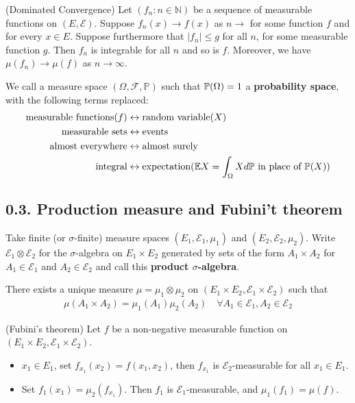 \documentclass[12pt,a4paper]{report}
\begin{document}
(Dominated Convergence) Let $(f_n :n \in \mathbb{N})$ be a sequence of measurable functions on $(E,\mathscr{E})$. Suppose $f_n(x) \rightarrow f(x)$ as $n\rightarrow$ for some function $f$ and for every $x\in E$. Suppose furthermore that $|f_n| \leq g$ for all $n$, for some measurable function $g$. Then $f_n$ is integrable for all $n$ and so is $f$. Moreover, we have $\mu(f_n) \rightarrow \mu(f)$ as $n\rightarrow \infty$.
\s

We call a measure space $(\Omega, \mathscr{F}, \mathbb{P})$ such that $\mathbb{P}(\Omega) =1$ a \textbf{probability space}, with the following terms replaced:
\begin{align*}
\text{measurable functions} (f) &\leftrightarrow \text{random variable} (X) \\
\text{measurable sets} &\leftrightarrow \text{events} \\
\text{almost everywhere} &\leftrightarrow \text{almost surely}\\
\text{integral} & \leftrightarrow \text{expectation}(\mathbb{E}{X} = \int_{\Omega} X d\mathbb{P} \text{ in place of } \mathbb{P}(X))
\end{align*}

\subsection*{0.3. Production measure and Fubini't theorem}

Take finite (or $\sigma$-finite) measure spaces $(E_1, \mathscr{E}_1, \mu_1)$ and $(E_2, \mathscr{E}_2, \mu_2)$. Write $\mathscr{E}_1 \otimes \mathscr{E}_2$ for the $\sigma$-algebra on $E_1 \times E_2$ generated by sets of the form $A_1 \times A_2$ for $A_1 \in \mathscr{E}_1$ and $A_2 \in \mathscr{E}_2$ and call this \textbf{product $\sigma$-algebra}.
\s

 There exists a unique measure $\mu = \mu_1 \otimes \mu_2$ on $(E_1 \times E_2, \mathscr{E}_1 \times \mathscr{E}_2)$ such that
\begin{align*}
\mu(A_1 \times A_2) = \mu_1(A_1) \mu_2(A_2) \quad \forall A_1 \in \mathscr{E}_1, A_2 \in \mathscr{E}_2
\end{align*}
\s

 (Fubini's theorem) Let $f$ be a non-negative measurable function on $(E_1 \times E_2, \mathscr{E}_1 \times \mathscr{E}_2)$.

\begin{itemize}
\item $x_1 \in E_1$, set $f_{x_1} (x_2) = f(x_1, x_2)$, then $f_{x_1}$ is $\mathscr{E_2}$-measurable for all $x_1 \in E_1$.

\item Set $f_1(x_1) = \mu_2(f_{x_1})$. Then $f_1$ is $\mathscr{E}_1$-measurable, and $\mu_1(f_1) = \mu(f)$.
\end{itemize} 
\eos
\end{document}
